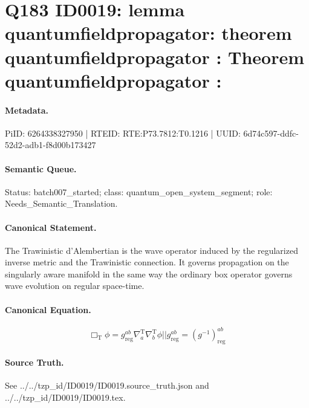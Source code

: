 \section*{Q183 ID0019: lemma quantumfieldpropagator: theorem quantumfieldpropagator : Theorem quantumfieldpropagator :}
\paragraph{Metadata.}
PiID: 6264338327950 | RTEID: RTE:P73.7812:T0.1216 | UUID: 6d74c597-ddfc-52d2-adb1-f8d00b173427

\paragraph{Semantic Queue.}
Status: batch007\_started; class: quantum\_open\_system\_segment; role: Needs\_Semantic\_Translation.

\paragraph{Canonical Statement.}
The Trawinistic d'Alembertian is the wave operator induced by the regularized inverse metric and the Trawinistic connection. It governs propagation on the singularly aware manifold in the same way the ordinary box operator governs wave evolution on regular space-time.

\paragraph{Canonical Equation.}
\[
\Box_{\mathrm{T}}\phi = g_{\mathrm{reg}}^{ab} \nabla^{\mathrm{T}}_{a} \nabla^{\mathrm{T}}_{b}\phi || g_{\mathrm{reg}}^{ab} = \left(g^{-1}\right)_{\mathrm{reg}}^{ab}
\]

\paragraph{Source Truth.}
See ../../tzp\_id/ID0019/ID0019.source\_truth.json and ../../tzp\_id/ID0019/ID0019.tex.
